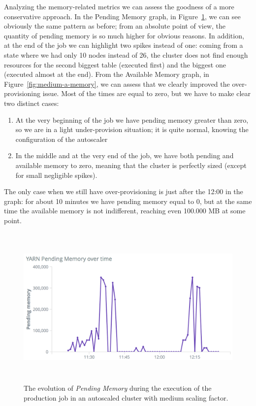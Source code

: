 \documentclass[12pt,twoside,cucitura]{toptesi}
\begin{document}
Analyzing the memory-related metrics we can assess the goodness of a more conservative approach. In the Pending Memory graph, in Figure~\ref{fig:medium-p-memory}, we can see obviously the same pattern as before; from an absolute point of view, the quantity of pending memory is so much higher for obvious reasons. In addition, at the end of the job we can highlight two spikes instead of one: coming from a state where we had only 10 nodes instead of 26, the cluster does not find enough resources for the second biggest table (executed first) and the biggest one (executed almost at the end).
From the Available Memory graph, in Figure~\ref{fig:medium-a-memory}, we can assess that we clearly improved the over-provisioning issue. Most of the times are equal to zero, but we have to make clear two distinct cases:
\begin{enumerate}
	\item At the very beginning of the job we have pending memory greater than zero, so we are in a light under-provision situation; it is quite normal, knowing the configuration of the autoscaler 
	\item In the middle and at the very end of the job, we have both pending and available memory to zero, meaning that the cluster is perfectly sized (except for small negligible spikes).
\end{enumerate}

The only case when we still have over-provisioning is just after the 12:00 in the graph: for about 10 minutes we have pending memory equal to 0, but at the same time the available memory is not indifferent, reaching even 100.000 MB at some point. 

\begin{figure}
\centering
\includegraphics[height=80mm]{medium-p-memory}
\caption{The evolution of \textit{Pending Memory} during the execution of the production job in an autoscaled cluster with medium scaling factor.}\label{fig:medium-p-memory}
\end{figure}
\end{document}
